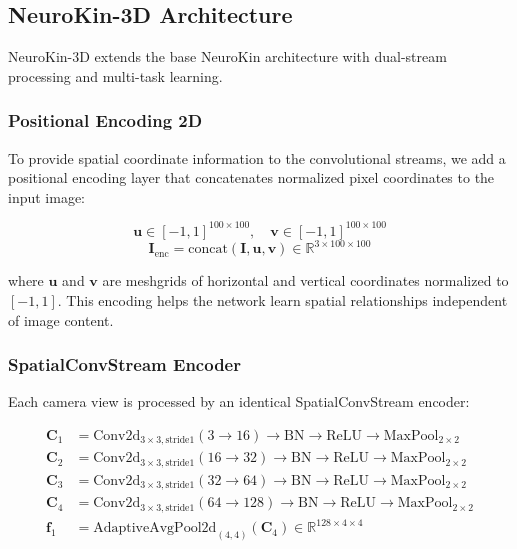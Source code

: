\documentclass[12pt,a4paper,oneside]{report}
\begin{document}
\subsection{NeuroKin-3D Architecture}

NeuroKin-3D extends the base NeuroKin architecture with dual-stream processing and multi-task learning.

\subsubsection{Positional Encoding 2D}

To provide spatial coordinate information to the convolutional streams, we add a positional encoding layer that concatenates normalized pixel coordinates to the input image:

\begin{equation}
\mathbf{u} \in [-1, 1]^{100 \times 100}, \quad \mathbf{v} \in [-1, 1]^{100 \times 100}
\end{equation}
\begin{equation}
\mathbf{I}_{\text{enc}} = \text{concat}(\mathbf{I}, \mathbf{u}, \mathbf{v}) \in \mathbb{R}^{3 \times 100 \times 100}
\end{equation}

where $\mathbf{u}$ and $\mathbf{v}$ are meshgrids of horizontal and vertical coordinates normalized to $[-1, 1]$. This encoding helps the network learn spatial relationships independent of image content.

\subsubsection{SpatialConvStream Encoder}

Each camera view is processed by an identical SpatialConvStream encoder:

\begin{align}
\mathbf{C}_1 &= \text{Conv2d}_{3\times3,\text{stride}1}(3 \rightarrow 16) \rightarrow \text{BN} \rightarrow \text{ReLU} \rightarrow \text{MaxPool}_{2\times2} \\
\mathbf{C}_2 &= \text{Conv2d}_{3\times3,\text{stride}1}(16 \rightarrow 32) \rightarrow \text{BN} \rightarrow \text{ReLU} \rightarrow \text{MaxPool}_{2\times2} \\
\mathbf{C}_3 &= \text{Conv2d}_{3\times3,\text{stride}1}(32 \rightarrow 64) \rightarrow \text{BN} \rightarrow \text{ReLU} \rightarrow \text{MaxPool}_{2\times2} \\
\mathbf{C}_4 &= \text{Conv2d}_{3\times3,\text{stride}1}(64 \rightarrow 128) \rightarrow \text{BN} \rightarrow \text{ReLU} \rightarrow \text{MaxPool}_{2\times2} \\
\mathbf{f}_1 &= \text{AdaptiveAvgPool2d}_{(4,4)}(\mathbf{C}_4) \in \mathbb{R}^{128 \times 4 \times 4}
\end{align}
\end{document}
